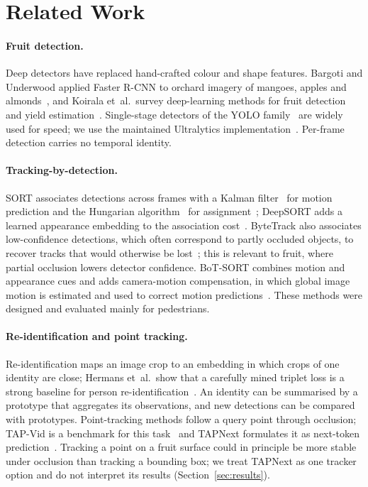 \documentclass[11pt,a4paper]{article}
\begin{document}
\section{Related Work}\label{sec:related}

\paragraph{Fruit detection.} Deep detectors have replaced hand-crafted colour and shape features. Bargoti and Underwood applied Faster R-CNN to orchard imagery of mangoes, apples and almonds~\cite{bargoti2017deep}, and Koirala et~al.\ survey deep-learning methods for fruit detection and yield estimation~\cite{koirala2019review}. Single-stage detectors of the YOLO family~\cite{redmon2016yolo} are widely used for speed; we use the maintained Ultralytics implementation~\cite{ultralytics}. Per-frame detection carries no temporal identity.

\paragraph{Tracking-by-detection.} SORT associates detections across frames with a Kalman filter~\cite{kalman1960} for motion prediction and the Hungarian algorithm~\cite{kuhn1955} for assignment~\cite{bewley2016sort}; DeepSORT adds a learned appearance embedding to the association cost~\cite{wojke2017deepsort}. ByteTrack also associates low-confidence detections, which often correspond to partly occluded objects, to recover tracks that would otherwise be lost~\cite{zhang2022bytetrack}; this is relevant to fruit, where partial occlusion lowers detector confidence. BoT-SORT combines motion and appearance cues and adds camera-motion compensation, in which global image motion is estimated and used to correct motion predictions~\cite{aharon2022botsort}. These methods were designed and evaluated mainly for pedestrians.

\paragraph{Re-identification and point tracking.} Re-identification maps an image crop to an embedding in which crops of one identity are close; Hermans et~al.\ show that a carefully mined triplet loss is a strong baseline for person re-identification~\cite{hermans2017triplet}. An identity can be summarised by a prototype that aggregates its observations, and new detections can be compared with prototypes. Point-tracking methods follow a query point through occlusion; TAP-Vid is a benchmark for this task~\cite{doersch2022tapvid} and TAPNext formulates it as next-token prediction~\cite{zholus2025tapnext}. Tracking a point on a fruit surface could in principle be more stable under occlusion than tracking a bounding box; we treat TAPNext as one tracker option and do not interpret its results (Section~\ref{sec:results}).
\end{document}
